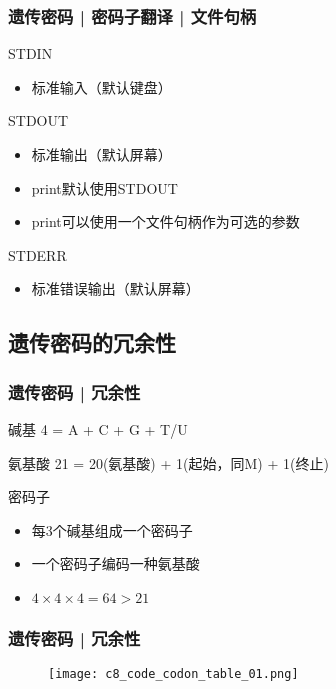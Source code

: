 \begin{frame}
  \frametitle{遗传密码 | 密码子翻译 | \alert{文件句柄}}
  \begin{block}{STDIN}
    \begin{itemize}
      \item 标准输入（默认键盘）
    \end{itemize}
  \end{block}
  \pause
  \begin{block}{STDOUT}
    \begin{itemize}
      \item 标准输出（默认屏幕）
      \item print默认使用STDOUT
      \item print可以使用一个文件句柄作为可选的参数
    \end{itemize}
  \end{block}
  \pause
  \begin{block}{STDERR}
    \begin{itemize}
      \item 标准错误输出（默认屏幕）
    \end{itemize}
  \end{block}
\end{frame}

\subsection{遗传密码的冗余性}
\begin{frame}
  \frametitle{遗传密码 | 冗余性}
  \begin{block}{碱基}
    4 = A + C + G + T/U
  \end{block}
  \pause
  \begin{block}{氨基酸}
    21 = 20(氨基酸) + 1(起始，同M) + 1(终止)
  \end{block}
  \pause
  \begin{block}{密码子}
    \begin{itemize}
      \item 每3个碱基组成一个密码子
      \item 一个密码子编码一种氨基酸
      \item $4 \times 4 \times 4 = 64 > 21$
    \end{itemize}
  \end{block}
\end{frame}

\begin{frame}
  \frametitle{遗传密码 | 冗余性}
  \begin{figure}
    \centering
    \texttt{[image: c8\_code\_codon\_table\_01.png]}
  \end{figure}
\end{frame}

